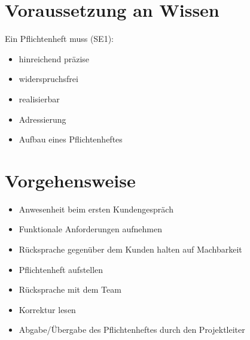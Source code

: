 \documentclass[ignorenonframetext, 11pt, table]{beamer}
\begin{document}
	\section{Voraussetzung an Wissen}
	\begin{frame}
		Ein Pflichtenheft muss (SE1):
		\begin{itemize}
		\setlength\itemsep{0.2em}	
			\item<2-> hinreichend präzise
			\item<3-> widerspruchsfrei
			\item<4-> realisierbar
			\item<5-> Adressierung
			\item<6-> Aufbau eines Pflichtenheftes
		\end{itemize}
	\end{frame}
	
	
	\section{Vorgehensweise}
	\begin{frame}
		\begin{itemize}
			\setlength\itemsep{0.2em}
			\item<1-> Anwesenheit beim ersten Kundengespräch
			\item<2-> Funktionale Anforderungen aufnehmen
			\item<3-> Rücksprache gegenüber dem Kunden halten auf Machbarkeit
			\item<4-> Pflichtenheft aufstellen
			\item<5-> Rücksprache mit dem Team
			\item<6-> Korrektur lesen
			\item<7-> Abgabe/Übergabe des Pflichtenheftes durch den Projektleiter
				\note[item]<7>{LETZTER SP}
		\end{itemize}
	\end{frame}
	
\end{document}
